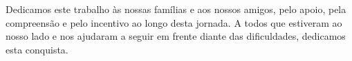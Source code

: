 %

\begin{dedicatoria}
    \vspace*{\fill} %

    \begin{flushright}
        \begin{minipage}{10cm}
            \begin{OnehalfSpace}
                Dedicamos este trabalho às nossas famílias e aos nossos amigos,
                pelo apoio, pela compreensão e pelo incentivo ao longo desta jornada.
                A todos que estiveram ao nosso lado e nos ajudaram a seguir em frente
                diante das dificuldades, dedicamos esta conquista.
            \end{OnehalfSpace}
        \end{minipage}
    \end{flushright}
\end{dedicatoria}
